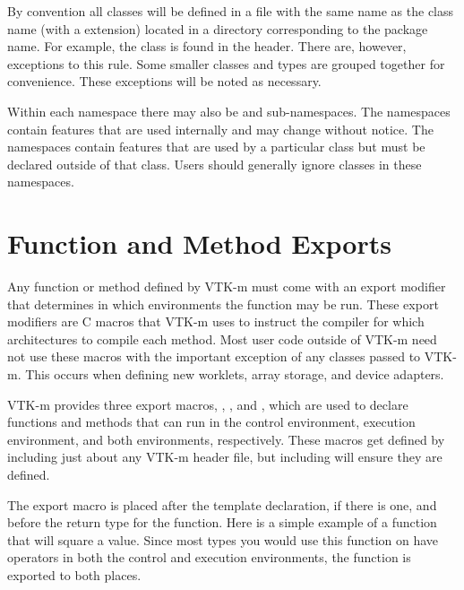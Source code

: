 By convention all classes will be defined in a file with the same name as
the class name (with a  extension) located in a directory
corresponding to the package name. For example, the 
class is found in the  header. There
are, however, exceptions to this rule. Some smaller classes and types are
grouped together for convenience. These exceptions will be noted as
necessary.

Within each namespace there may also
be 
and 
sub-namespaces. The  namespaces contain features
that are used internally and may change without
notice. The  namespaces contain features that are
used by a particular class but must be declared outside of that
class. Users should generally ignore classes in these namespaces.



\section{Function and Method Exports}
\label{sec:FunctionAndMethodExports}

Any function or method defined by VTK-m must come with an export modifier
that determines in which environments the function may be run. These export
modifiers are C macros that VTK-m uses to instruct the compiler for which
architectures to compile each method. Most user code outside of VTK-m need
not use these macros with the important exception of any classes passed to
VTK-m. This occurs when defining new worklets, array storage, and device
adapters.

VTK-m provides three export macros, \vtkmcontexport, \vtkmexecexport, and
\vtkmexeccontexport, which are used to declare functions and methods that
can run in the control environment, execution environment, and both
environments, respectively. These macros get defined by including just
about any VTK-m header file, but including  will
ensure they are defined. 

The export macro is placed after the template declaration, if there is one,
and before the return type for the function. Here is a simple example of a
function that will square a value. Since most types you would use this
function on have operators in both the control and execution environments,
the function is exported to both places.

